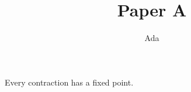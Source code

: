 \title{Paper A}\author{Ada}
\begin{theorem}\label{thm:main}
Every contraction has a fixed point.
\end{theorem}
\cite{paper-b}\cite{missing}\cite{absent}

